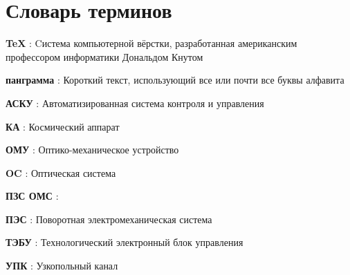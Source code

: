 \chapter*{Словарь терминов}             %

\textbf{TeX} : Cистема компьютерной вёрстки, разработанная американским профессором информатики Дональдом Кнутом

\textbf{панграмма} : Короткий текст, использующий все или почти все буквы алфавита

\textbf{АСКУ} : Автоматизированная система контроля и управления

\textbf {КА} : Космический аппарат

\textbf {ОМУ} : Оптико-механическое  устройство

\textbf {OC} : Оптическая система

\textbf {ПЗС ОМС} : 

\textbf {ПЭС} : Поворотная электромеханическая система

\textbf {ТЭБУ} : Технологический электронный блок управления 

\textbf {УПК} : Узкопольный канал